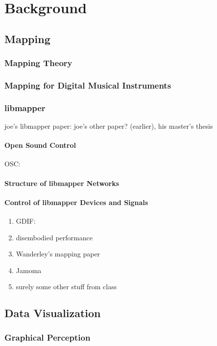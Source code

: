 \chapter{Background}

\section{Mapping}
	\subsection{Mapping Theory}
	\subsection{Mapping for Digital Musical Instruments}
	\subsection{libmapper}
		joe's libmapper paper: 
		joe's other paper? (earlier), his master's thesis
		\subsubsection{Open Sound Control}
		OSC: 
		\subsubsection{Structure of libmapper Networks}
		\subsubsection{Control of libmapper Devices and Signals}
	\begin{enumerate}
		\item GDIF: 
		\item disembodied performance
		\item Wanderley's mapping paper 
		\item Jamoma 
		\item surely some other stuff from class
	\end{enumerate}

\section{Data Visualization}
	\subsection{Graphical Perception}
